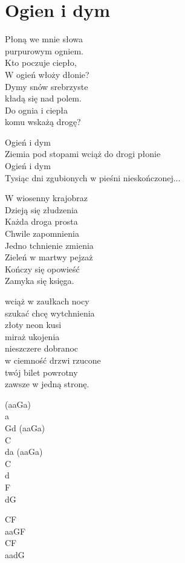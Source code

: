 \section{Ogien i dym}
\begin{text}
\vfill\null
Płoną we mnie słowa\\
purpurowym ogniem.\\
Kto poczuje ciepło,\\
W ogień włoży dłonie?\\
Dymy snów srebrzyste\\
kładą się nad polem.\\
Do ognia i ciepła\\
komu wskażą drogę?

Ogień i dym\\
Ziemia pod stopami wciąż do drogi płonie\\
Ogień i dym\\
Tysiąc dni zgubionych w pieśni nieskończonej...

W wiosenny krajobraz\\
Dzieją się złudzenia\\
Każda droga prosta\\
Chwile zapomnienia\\
Jedno tchnienie zmienia\\
Zieleń w martwy pejzaż\\
Kończy się opowieść\\
Zamyka się księga.

wciąż w zaułkach nocy\\
szukać chcę wytchnienia\\
złoty neon kusi\\
miraż ukojenia\\
nieszczere dobranoc\\
w ciemność drzwi rzucone\\
twój bilet powrotny\\
zawsze w jedną stronę.
\end{text}
\begin{chord}
(aaGa)\\
a\\
Gd (aaGa)\\
C\\
da (aaGa)\\
C\\
d\\
F\\
dG

CF\\
aaGF\\
CF\\
aadG
\end{chord}